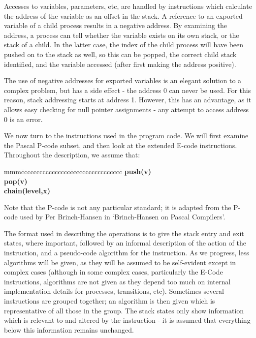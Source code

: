 Accesses to variables, parameters, etc, are handled by
instructions which calculate the address of the variable
as an offset in the stack. A reference to an exported
variable of a child process results in a negative
address. By examining the address, a process can tell
whether the variable exists on its own stack, or the
stack of a child. In the latter case, the index of the
child process will have been pushed on to the stack as
well, so this can be popped, the correct child stack
identified, and the variable accessed (after first making
the address positive).

The use of negative addresses for exported variables is
an elegant solution to a complex problem, but has a side
effect - the address 0 can never be used. For this
reason, stack addressing starts at address 1. However,
this has an advantage, as it allows easy checking for
null pointer assignments - any attempt to access address
0 is an error.

We now turn to the instructions used in the program code.
We will first examine the Pascal P-code subset, and then
look at the extended E-code instructions. Throughout the
description, we assume that:

\begin{tabbing}
mmm\=cccccccccccccccc\=ccccccccccccccccc\=\+\kill
{\bf push(v)}\\
{\bf pop(v)}\\
{\bf chain(level,x)}\\
\end{tabbing}

Note that the P-code is not any particular standard; it
is adapted from the P-code used by Per Brinch-Hansen in
`Brinch-Hansen on Pascal Compilers'.

The format used in describing the operations is to give the stack
entry and exit states, where important, followed by an informal
description of the action of the instruction, and a pseudo-code
algorithm for the instruction. As we progress, less algorithms will
be given, as they will be assumed to be self-evident except in
complex cases (although in some complex cases, particularly the
E-Code instructions, algorithms are not given as they depend too much
on internal implementation details for processes, transitions, etc).
Sometimes several instructions are grouped together;
an algorithm is then given which is representative of all those in
the group. The stack states only show information which is
relevant to and altered by the instruction - it is assumed that
everything below this information remains unchanged.

